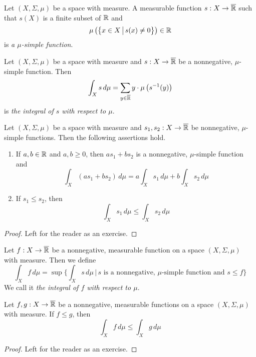 \begin{definition}
    Let $(X,\Sigma,\mu)$ be a space with measure. A measurable function $s:X\rightarrow \overline{{\mathbb R}}$ such that $s(X)$ is a finite subset of ${\mathbb R}$ and
    $$\mu\left(\big\{x\in X\,\big|\,s(x)\neq 0\big\}\right) \in {\mathbb R}$$
    is \textit{a $\mu$-simple function}.
\end{definition}

\begin{definition}
    Let $(X,\Sigma,\mu)$ be a space with measure and $s:X\rightarrow \overline{{\mathbb R}}$ be a nonnegative, $\mu$-simple function. Then
    $$\int_Xs\,d\mu = \sum_{y\in \overline{{\mathbb R}}}y\cdot \mu\left(s^{-1}(y)\right)$$
    is \textit{the integral of $s$ with respect to $\mu$}.
\end{definition}

\begin{fact}\label{fact:basics_for_simple_functions}
    Let $(X,\Sigma,\mu)$ be a space with measure and $s_1, s_2:X\rightarrow \overline{{\mathbb R}}$ be nonnegative, $\mu$-simple functions. Then the following assertions hold.
    \begin{enumerate}[label=\emph{\textbf{(\arabic*)}}, leftmargin=*]
        \item If $a, b\in {\mathbb R}$ and $a, b\geq 0$, then $a s_1 + b s_2$ is a nonnegative, $\mu$-simple function and
              $$\int_X\left(a s_1 + b s_2\right)\,d\mu = a \int_Xs_1\,d\mu + b \int_Xs_2\,d\mu$$
        \item If $s_1\leq s_2$, then
              $$\int_Xs_1\,d\mu \leq \int_Xs_2\,d\mu$$
    \end{enumerate}
\end{fact}
\begin{proof}
    Left for the reader as an exercise.
\end{proof}

\begin{definition}
    Let $f:X\rightarrow \overline{{\mathbb R}}$ be a nonnegative, measurable function on a space $(X,\Sigma,\mu)$ with measure. Then we define
    $$\int_X f\,d\mu = \sup\bigg\{\int_X s\, d\mu\,\bigg|\,s\mbox{ is a nonnegative, }\mu\mbox{-simple function and }s\leq f\bigg\}$$
    We call it \textit{the integral of $f$ with respect to $\mu$}.
\end{definition}

\begin{fact}\label{fact:integral_is_monotone}
    Let $f,g:X\rightarrow \overline{{\mathbb R}}$ be a nonnegative, measurable functions on a space $(X,\Sigma,\mu)$ with measure. If $f\leq g$, then
    $$\int_Xf\,d\mu \leq \int_Xg\,d\mu$$
\end{fact}
\begin{proof}
    Left for the reader as an exercise.
\end{proof}


